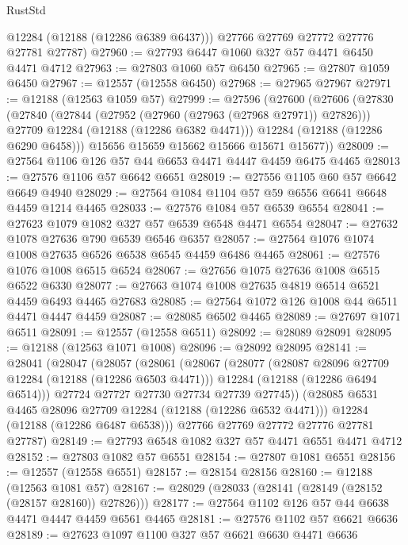 \begin{lexlean}{RustStd}
\begin{coremodule}
        @12284
        (@12188 (@12286 @6389 @6437)))
      @27766
      @27769
      @27772
      @27776
      @27781
      @27787)
@27960 := @27793 @6447 @1060 @327 @57 @4471 @6450 @4471 @4712
@27963 := @27803 @1060 @57 @6450
@27965 := @27807 @1059 @6450
@27967 := @12557 (@12558 @6450)
@27968 := @27965 @27967
@27971 := @12188 (@12563 @1059 @57)
@27999 := @27596
    (@27600
      (@27606
        (@27830
          (@27840
            (@27844 (@27952 (@27960 (@27963 (@27968 @27971)) @27826)))
            @27709
            @12284
            (@12188 (@12286 @6382 @4471)))
          @12284
          (@12188 (@12286 @6290 @6458)))
        @15656
        @15659
        @15662
        @15666
        @15671
        @15677))
@28009 := @27564 @1106 @126 @57 @44 @6653 @4471 @4447 @4459 @6475 @4465
@28013 := @27576 @1106 @57 @6642 @6651
@28019 := @27556 @1105 @60 @57 @6642 @6649 @4940
@28029 := @27564 @1084 @1104 @57 @59 @6556 @6641 @6648 @4459 @1214 @4465
@28033 := @27576 @1084 @57 @6539 @6554
@28041 := @27623 @1079 @1082 @327 @57 @6539 @6548 @4471 @6554
@28047 := @27632 @1078 @27636 @790 @6539 @6546 @6357
@28057 := @27564 @1076 @1074 @1008 @27635 @6526 @6538 @6545 @4459 @6486 @4465
@28061 := @27576 @1076 @1008 @6515 @6524
@28067 := @27656 @1075 @27636 @1008 @6515 @6522 @6330
@28077 := @27663 @1074 @1008 @27635 @4819 @6514 @6521 @4459 @6493 @4465 @27683
@28085 := @27564 @1072 @126 @1008 @44 @6511 @4471 @4447 @4459
@28087 := @28085 @6502 @4465
@28089 := @27697 @1071 @6511
@28091 := @12557 (@12558 @6511)
@28092 := @28089 @28091
@28095 := @12188 (@12563 @1071 @1008)
@28096 := @28092 @28095
@28141 := @28041
    (@28047
      (@28057
        (@28061
          (@28067
            (@28077
              (@28087 @28096 @27709 @12284 (@12188 (@12286 @6503 @4471)))
              @12284
              (@12188 (@12286 @6494 @6514)))
            @27724
            @27727
            @27730
            @27734
            @27739
            @27745))
        (@28085 @6531 @4465 @28096 @27709 @12284 (@12188 (@12286 @6532 @4471)))
        @12284
        (@12188 (@12286 @6487 @6538)))
      @27766
      @27769
      @27772
      @27776
      @27781
      @27787)
@28149 := @27793 @6548 @1082 @327 @57 @4471 @6551 @4471 @4712
@28152 := @27803 @1082 @57 @6551
@28154 := @27807 @1081 @6551
@28156 := @12557 (@12558 @6551)
@28157 := @28154 @28156
@28160 := @12188 (@12563 @1081 @57)
@28167 := @28029 (@28033 (@28141 (@28149 (@28152 (@28157 @28160)) @27826)))
@28177 := @27564 @1102 @126 @57 @44 @6638 @4471 @4447 @4459 @6561 @4465
@28181 := @27576 @1102 @57 @6621 @6636
@28189 := @27623 @1097 @1100 @327 @57 @6621 @6630 @4471 @6636

\end{coremodule}
\end{lexlean}
